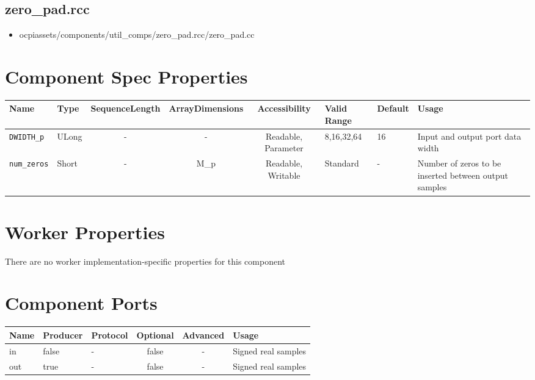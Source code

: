 \documentclass{article}
\def\comp{zero\_pad}
\begin{document}
\subsection*{\comp.rcc}
\begin{itemize}
	\item ocpiassets/components/util\_comps/\comp.rcc/\comp.cc
\end{itemize}
\begin{landscape}
	\section*{Component Spec Properties}
	\begin{scriptsize}
		\begin{tabular}{|p{2cm}|p{1.5cm}|c|c|c|p{1.5cm}|p{1cm}|p{7cm}|}
			\hline
			\rowcolor{blue}
			Name          		& Type  & SequenceLength & ArrayDimensions & Accessibility       & Valid Range & Default & Usage              	\\
			\hline
			\verb+DWIDTH_p+ 	& ULong & -              & -               & Readable, Parameter & 8,16,32,64  & 16      & Input and output port data width\\
			\hline
			\verb+num_zeros+  	& Short & -              & M\_p            & Readable, Writable	 & Standard    & -       & Number of zeros to be inserted between output samples \\
			\hline
		\end{tabular}
	\end{scriptsize}

	\section*{Worker Properties}
	There are no worker implementation-specific properties for this component 

	\section*{Component Ports}
	\begin{scriptsize}
		\begin{tabular}{|M{2cm}|M{1.5cm}|M{4cm}|c|c|p{9cm}|}
			\hline
			\rowcolor{blue}
			Name & Producer & Protocol			& Optional & Advanced 					& Usage      			\\
			\hline
			in   & false    & -					& false    & -        					& Signed real samples  	\\
			\hline
			out  & true     & - 				& false    & -							& Signed real samples	\\
			\hline
		\end{tabular}
	\end{scriptsize}

\end{landscape}
\end{document}
